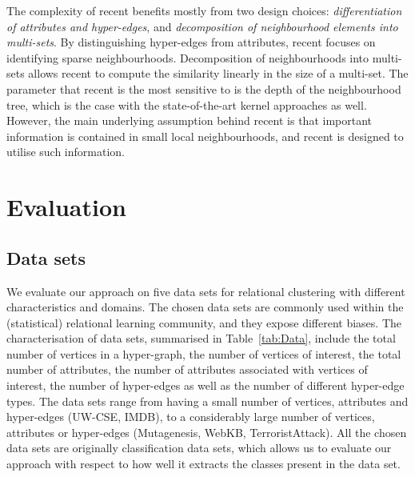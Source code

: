 The complexity of \gls{recent} benefits mostly from two design choices: \textit{differentiation of attributes and hyper-edges}, and \textit{decomposition of neighbourhood elements into multi-sets}.
By distinguishing hyper-edges from attributes, \gls{recent} focuses on identifying sparse neighbourhoods.
Decomposition of neighbourhoods into multi-sets allows \gls{recent} to compute the similarity linearly in the size of a multi-set.
The parameter that \gls{recent} is the most sensitive to is the depth of the neighbourhood tree, which is the case with the state-of-the-art kernel approaches as well.
However, the main underlying assumption behind \gls{recent} is that important information is contained in small local neighbourhoods, and \gls{recent} is designed to utilise such information.


\section{Evaluation}
\label{sec:Evaluation}



\subsection{Data sets}



We evaluate our approach on five data sets for relational clustering with different characteristics and domains.
The chosen data sets are commonly used within the (statistical) relational learning community, and they expose different biases.
The characterisation of data sets, summarised in Table~\ref{tab:Data}, include the total number of vertices in a hyper-graph, the number of vertices of interest, the total number of attributes, the number of attributes associated with vertices of interest, the number of hyper-edges as well as the number of different hyper-edge types.
The data sets range from having a small number of vertices, attributes and hyper-edges (UW-CSE, IMDB), to a considerably large number of vertices, attributes or hyper-edges (Mutagenesis, WebKB, TerroristAttack).
All the chosen data sets are originally classification data sets, which allows us to evaluate our approach with respect to how well it extracts the classes present in the data set.




